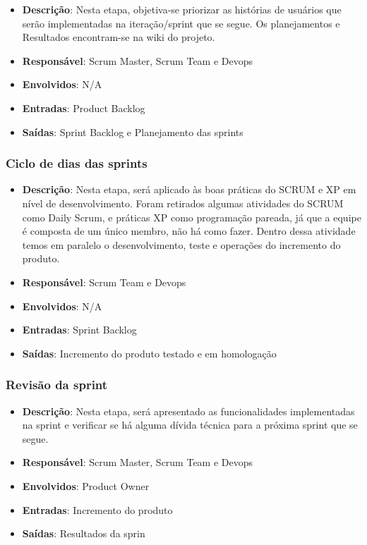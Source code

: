 \begin{itemize}
  \item \textbf{Descrição}: Nesta etapa, objetiva-se priorizar as histórias de usuários que serão implementadas na
    iteração/sprint que se segue. Os planejamentos e Resultados encontram-se na wiki do projeto.
  \item \textbf{Responsável}: Scrum Master, Scrum Team e Devops
  \item \textbf{Envolvidos}: N/A
  \item \textbf{Entradas}: Product Backlog
  \item \textbf{Saídas}: Sprint Backlog e Planejamento das sprints
\end{itemize}

\subsubsection{Ciclo de dias das sprints}

\begin{itemize}
  \item \textbf{Descrição}: Nesta etapa, será aplicado às boas práticas do SCRUM e XP em nível de desenvolvimento. Foram retirados algumas atividades do SCRUM como Daily Scrum, e práticas XP como programação pareada, já que a equipe é composta de um único membro, não há como fazer. Dentro dessa atividade temos em paralelo o desenvolvimento, teste e operações do incremento do produto.
  \item \textbf{Responsável}: Scrum Team e Devops
  \item \textbf{Envolvidos}: N/A
  \item \textbf{Entradas}: Sprint Backlog
  \item \textbf{Saídas}: Incremento do produto testado e em homologação
\end{itemize}

\subsubsection{Revisão da sprint}

\begin{itemize}
  \item \textbf{Descrição}: Nesta etapa, será apresentado as funcionalidades implementadas na sprint e verificar se há alguma dívida técnica para a próxima sprint que se segue.
  \item \textbf{Responsável}: Scrum Master, Scrum Team e Devops
  \item \textbf{Envolvidos}: Product Owner
  \item \textbf{Entradas}: Incremento do produto
  \item \textbf{Saídas}: Resultados da sprin
\end{itemize}

